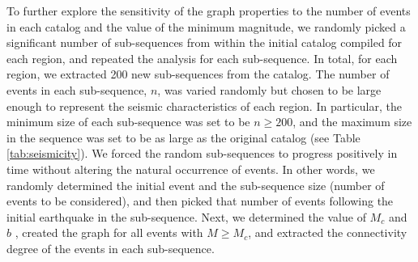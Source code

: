 To further explore the sensitivity of the graph properties to the number of events in each catalog and the value of the minimum magnitude, we randomly picked a significant number of sub-sequences from within the initial catalog compiled for each region, and repeated the analysis for each sub-sequence. In total, for each region, we extracted 200 new sub-sequences from the  catalog. The number of events in each sub-sequence, $n$, was varied randomly but chosen to be large enough to represent the seismic characteristics of each region. In particular, the minimum size of each sub-sequence was set to be $n \geq 200$, and the maximum size in the sequence was set to be as large as the original  catalog (see Table \ref{tab:seismicity}). We forced the random sub-sequences to progress positively in time without altering the natural occurrence of events. In other words, we randomly determined the initial event and the sub-sequence size (number of events to be considered), and then picked that number of events following the initial earthquake in the sub-sequence. Next, we determined the value of $M_c$ and $b$ , created the graph for all events with $M \geq M_c$, and extracted the connectivity degree of the events in each sub-sequence. 

